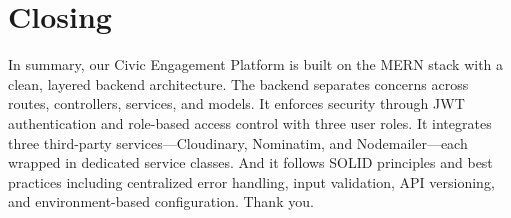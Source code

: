 \documentclass[12pt,a4paper]{article}
\begin{document}
\section*{Closing}

In summary, our Civic Engagement Platform is built on the MERN stack with a clean, layered backend architecture. The backend separates concerns across routes, controllers, services, and models. It enforces security through JWT authentication and role-based access control with three user roles. It integrates three third-party services---Cloudinary, Nominatim, and Nodemailer---each wrapped in dedicated service classes. And it follows SOLID principles and best practices including centralized error handling, input validation, API versioning, and environment-based configuration. Thank you.
\end{document}
